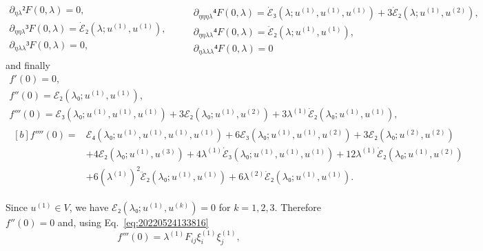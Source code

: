 \documentclass[12pt, final]{scrartcl}
\theoremstyle{definition}
\newcommand{\E}{\mathcal E}
\newcommand{\order}[2][1]{#2^{(#1)}}
\begin{document}
\begin{equation*}
  \begin{gathered}
    ∂_{η\lambda}² F(0, \lambda) = 0,\\
    ∂_{ηη\lambda}³ F(0, \lambda) = \dot{\E}₂(\lambda; \order[1]u, \order[1]u),\\
    ∂_{η\lambda\lambda}³ F(0, \lambda) = 0,\\
  \end{gathered}
  \qquad
  \begin{gathered}
    ∂_{ηηη\lambda}⁴ F(0, \lambda) = \dot{\E}₃(\lambda; \order[1]u, \order[1]u, \order[1]u) + 3\dot{\E}₂(\lambda; \order[1]u, \order[2]u),\\
    ∂_{ηη\lambda\lambda}⁴ F(0, \lambda) = \ddot{\E}₂(\lambda; \order[1]u, \order[1]u),\\
    ∂_{η\lambda\lambda\lambda}⁴ F(0, \lambda) = 0
  \end{gathered}
\end{equation*}
and finally
\begin{gather}
  f'(0) = 0,\\
  f''(0) = \E₂(\lambda₀; \order[1]u, \order[1]u),\\
  f'''(0) =\E₃(\lambda₀; \order[1]u, \order[1]u, \order[1]u) + 3\E₂(\lambda₀; \order[1]u, \order[2]u) + 3\order[1]\lambda \dot{\E}₂(\lambda₀; \order[1]u, \order[1]u),\\
  \label{eq:20220905063614}
  \begin{aligned}[b]
    f''''(0) ={}
    & \E₄(\lambda₀; \order[1]u, \order[1]u, \order[1]u, \order[1]u) + 6\E₃(\lambda₀; \order[1]u, \order[1]u, \order[2]u) + 3\E₂(\lambda₀; \order[2]u, \order[2]u)\\
    & + 4\E₂(\lambda₀; \order[1]u, \order[3]u) + 4 \order[1]\lambda \dot{\E}₃(\lambda₀; \order[1]u, \order[1]u, \order[1]u) + 12 \order[1]\lambda \dot{\E}₂(\lambda₀; \order[1]u, \order[2]u)\\
    & + 6( \order[1]\lambda )^2 \ddot{\E}₂(\lambda₀; \order[1]u, \order[1]u) + 6\order[2]\lambda \dot{\E}₂(\lambda₀; \order[1]u, \order[1]u).
  \end{aligned}
\end{gather}

Since $\order[1]u \in V$, we have $\E₂(\lambda₀; \order[1]u, \order[k]u) = 0$ for
$k = 1, 2, 3$. Therefore $f''(0)=0$ and, using
Eq.~\eqref{eq:20220524133816}
\begin{equation}
  \label{eq:20220601055448}
  f'''(0) = \order[1]\lambda F_{ij} \order[1]{ξ_i} \order[1]{ξ_j},
\end{equation}
\end{document}
